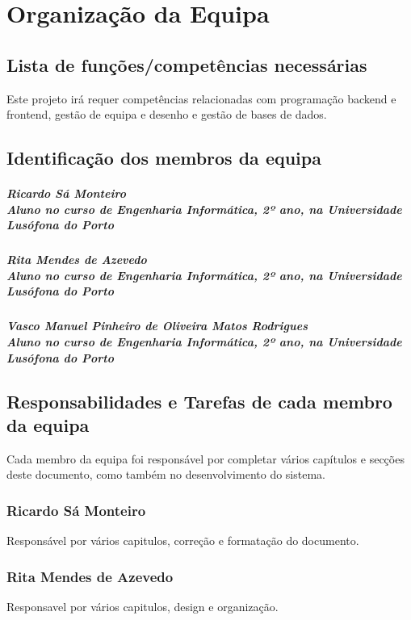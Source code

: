 \chapter{Organização da Equipa}
\label{organizacao_da_equipa}
\section{Lista de funções/competências necessárias}
Este projeto irá requer competências relacionadas com programação backend e frontend, gestão de equipa e desenho e gestão de bases de dados.
\section{Identificação dos membros da equipa}
\paragraph{Ricardo Sá Monteiro 
\\ Aluno no curso de Engenharia Informática, 2º ano, na Universidade Lusófona do Porto}
\paragraph{Rita Mendes de Azevedo
\\ Aluno no curso de Engenharia Informática, 2º ano, na Universidade Lusófona do Porto}
\paragraph{Vasco Manuel Pinheiro de Oliveira Matos Rodrigues
\\ Aluno no curso de Engenharia Informática, 2º ano, na Universidade Lusófona do Porto}
\section{Responsabilidades e Tarefas de cada membro da equipa}
Cada membro da equipa foi responsável por completar vários capítulos e secções deste documento, como também no desenvolvimento do sistema.
\subsection{Ricardo Sá Monteiro}
Responsável por vários capitulos, correção e formatação do documento.
\subsection{Rita Mendes de Azevedo}
Responsavel por vários capitulos, design e organização.
